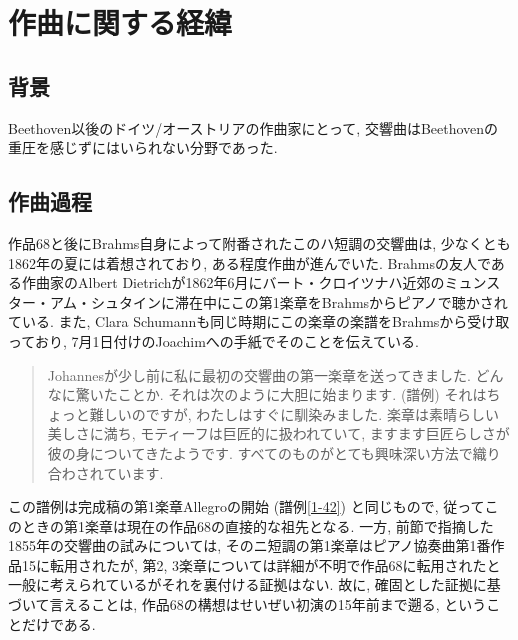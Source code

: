 
\chapter{作曲に関する経緯}

\section{背景}\label{sec: background}

Beethoven以後のドイツ/オーストリアの作曲家にとって, 交響曲はBeethovenの重圧を感じずにはいられない分野であった.




\section{作曲過程}\label{sec: process}

作品68と後にBrahms自身によって附番されたこのハ短調の交響曲は, 少なくとも1862年の夏には着想されており, ある程度作曲が進んでいた.
Brahmsの友人である作曲家のAlbert Dietrichが1862年6月にバート・クロイツナハ近郊のミュンスター・アム・シュタインに滞在中にこの第1楽章をBrahmsからピアノで聴かされている\cite{kaisouroku}.
また, Clara Schumannも同じ時期にこの楽章の楽譜をBrahmsから受け取っており, 7月1日付けのJoachimへの手紙でそのことを伝えている.
\begin{quote}
	Johannesが少し前に私に最初の交響曲の第一楽章を送ってきました. どんなに驚いたことか. それは次のように大胆に始まります.
	(譜例) %
	それはちょっと難しいのですが, わたしはすぐに馴染みました.
	楽章は素晴らしい美しさに満ち, モティーフは巨匠的に扱われていて, ますます巨匠らしさが彼の身についてきたようです.
	すべてのものがとても興味深い方法で織り合わされています.\cite{compos}
\end{quote}
この譜例は完成稿の第1楽章Allegroの開始 (譜例\ref{1-42}) と同じもので, 従ってこのときの第1楽章は現在の作品68の直接的な祖先となる.
一方, 前節で指摘した1855年の交響曲の試みについては, そのニ短調の第1楽章はピアノ協奏曲第1番作品15に転用されたが,
第2, 3楽章については詳細が不明で作品68に転用されたと一般に考えられているがそれを裏付ける証拠はない.
故に, 確固とした証拠に基づいて言えることは, 作品68の構想はせいぜい初演の15年前まで遡る, ということだけである.

